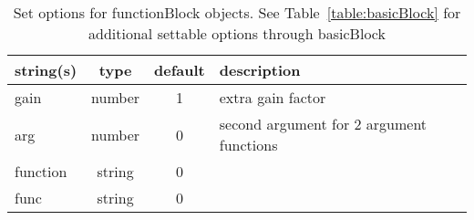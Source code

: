 \begin{table}[ht]
\centering
\begin{tabular}{p{5cm} c c p{7cm}}
\hline
string(s) & type & default & description \\
\hline
gain & number & 1 & extra gain factor\\
arg & number & 0 & second argument for 2 argument functions\\
function & string & 0 & \\
func & string & 0 & \\
\hline
\end{tabular}
\caption{Set options for functionBlock objects. See Table~\ref{table:basicBlock} for additional settable options through basicBlock}
\label{table:functionBlock}
\end{table}
